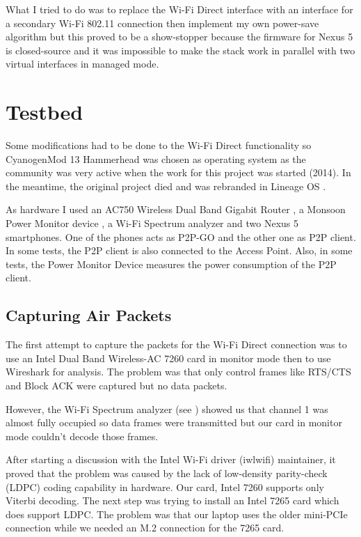What I tried to do was to replace the Wi-Fi Direct interface with an interface for a secondary Wi-Fi 802.11 connection then implement my own power-save algorithm but this proved to be a show-stopper because the firmware for Nexus 5 is closed-source and it was impossible to make the stack work in parallel with two virtual interfaces in managed mode.

\section{Testbed}
\label{sec:testbed}

Some modifications had to be done to the Wi-Fi Direct functionality so CyanogenMod 13 Hammerhead was chosen as operating system as the community was very active when the work for this project was started (2014). In the meantime, the original project died and was rebranded in Lineage OS \cite{cite-lineage}.

As hardware I used an AC750 Wireless Dual Band Gigabit Router \cite{cite-router}, a Monsoon Power Monitor device \cite{cite-monsoon}, a Wi-Fi Spectrum analyzer and two Nexus 5 smartphones. One of the phones acts as P2P-GO and the other one as P2P client. In some tests, the P2P client is also connected to the Access Point. Also, in some tests, the Power Monitor Device measures the power consumption of the P2P client.

\subsection{Capturing Air Packets}
\label{sub-sec:proj-scopemonitormode}

The first attempt to capture the packets for the Wi-Fi Direct connection was to use an Intel Dual Band Wireless-AC 7260 card \cite{cite-intel7260} in monitor mode then to use Wireshark \cite{cite-wireshark}  for analysis. The problem was that only control frames like RTS/CTS and Block ACK were captured but no data packets.

However, the Wi-Fi Spectrum analyzer (see ) showed us that channel 1 was almost fully occupied so data frames were transmitted but our card in monitor mode couldn't decode those frames.


After starting a discussion \cite{cite-monitordiscussion} with the Intel Wi-Fi driver (iwlwifi) maintainer, it proved that the problem was caused by the lack of low-density parity-check (LDPC) coding capability in hardware. Our card, Intel 7260 supports only Viterbi decoding. The next step was trying to install an Intel 7265 card which does support LDPC. The problem was that our laptop uses the older mini-PCIe connection while we needed an M.2 connection for the 7265 card.


